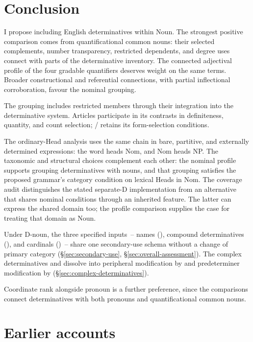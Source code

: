 \documentclass[12pt]{article}
\begin{document}
\section{Conclusion}\label{sec:conclusion}

I propose including English determinatives within Noun. The strongest positive comparison comes from quantificational common nouns: their selected complements, number transparency, restricted dependents, and degree uses connect with parts of the determinative inventory. The connected adjectival profile of the four gradable quantifiers deserves weight on the same terms. Broader constructional and referential connections, with partial inflectional corroboration, favour the nominal grouping.

The grouping includes restricted members through their integration into the determinative system. Articles participate in its contrasts in definiteness, quantity, and count selection; / retains its form-selection conditions.

The ordinary-Head analysis uses the same chain in bare, partitive, and externally determined expressions: the word heads Nom, and Nom heads NP. The taxonomic and structural choices complement each other: the nominal profile supports grouping determinatives with nouns, and that grouping satisfies the proposed grammar's category condition on lexical Heads in Nom. The coverage audit distinguishes the stated separate-D implementation from an alternative that shares nominal conditions through an inherited feature. The latter can express the shared domain too; the profile comparison supplies the case for treating that domain as Noun.

Under D-noun, the three specified inputs~-- names (), compound determinatives (), and cardinals ()~-- share one secondary-use schema without a change of primary category (§\ref{sec:secondary-use}, §\ref{sec:overall-assessment}). The complex determinatives  and  dissolve into peripheral modification by  and predeterminer modification by  (§\ref{sec:complex-determinatives}).

Coordinate rank alongside pronoun is a further preference, since the comparisons connect determinatives with both pronouns and quantificational common nouns.

\appendix

\section{Earlier accounts}\label{sec:historical}
\end{document}
